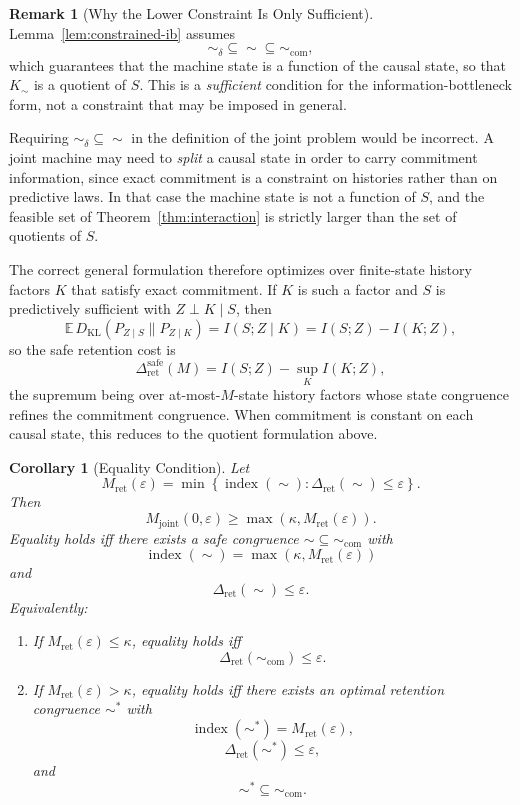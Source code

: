 \documentclass[12pt]{article}
\newtheorem{corollary}[theorem]{Corollary}
\theoremstyle{definition}
\newtheorem{remark}[theorem]{Remark}
\begin{document}
\begin{remark}[Why the Lower Constraint Is Only Sufficient]
\label{rem:no-lower-constraint}
Lemma~\ref{lem:constrained-ib} assumes
\[
\sim_\delta\subseteq\sim\subseteq\sim_{\mathrm{com}},
\]
which guarantees that the machine state is a function of the causal state, so
that $K_\sim$ is a quotient of $S$.  This is a \emph{sufficient} condition for
the information-bottleneck form, not a constraint that may be imposed in
general.

Requiring $\sim_\delta\subseteq\sim$ in the definition of the joint problem
would be incorrect.  A joint machine may need to \emph{split} a causal state
in order to carry commitment information, since exact commitment is a
constraint on histories rather than on predictive laws.  In that case the
machine state is not a function of $S$, and the feasible set of
Theorem~\ref{thm:interaction} is strictly larger than the set of quotients of
$S$.

The correct general formulation therefore optimizes over finite-state history
factors $K$ that satisfy exact commitment.  If $K$ is such a factor and $S$ is
predictively sufficient with $Z\perp K\mid S$, then
\[
\mathbb E\,D_{\mathrm{KL}}(P_{Z\mid S}\|P_{Z\mid K})
=
I(S;Z\mid K)
=
I(S;Z)-I(K;Z),
\]
so the safe retention cost is
\[
\Delta_{\mathrm{ret}}^{\mathrm{safe}}(M)
=
I(S;Z)
-
\sup_{K}
I(K;Z),
\]
the supremum being over at-most-$M$-state history factors whose state
congruence refines the commitment congruence.  When commitment is constant on
each causal state, this reduces to the quotient formulation above.
\end{remark}

\begin{corollary}[Equality Condition]
\label{cor:interaction-equality}
Let
\[
M_{\mathrm{ret}}(\varepsilon)
=
\min
\left\{
\operatorname{index}(\sim):
\Delta_{\mathrm{ret}}(\sim)\le\varepsilon
\right\}.
\]
Then
\[
M_{\mathrm{joint}}(0,\varepsilon)
\ge
\max(\kappa,M_{\mathrm{ret}}(\varepsilon)).
\]
Equality holds iff there exists a safe congruence
$\sim\subseteq\sim_{\mathrm{com}}$ with
\[
\operatorname{index}(\sim)
=
\max(\kappa,M_{\mathrm{ret}}(\varepsilon))
\]
and
\[
\Delta_{\mathrm{ret}}(\sim)\le\varepsilon.
\]
Equivalently:
\begin{enumerate}[label=(\arabic*)]
\item If $M_{\mathrm{ret}}(\varepsilon)\le\kappa$, equality holds iff
\[
\Delta_{\mathrm{ret}}(\sim_{\mathrm{com}})\le\varepsilon.
\]
\item If $M_{\mathrm{ret}}(\varepsilon)>\kappa$, equality holds iff there
exists an optimal retention congruence $\sim^*$ with
\[
\operatorname{index}(\sim^*)=M_{\mathrm{ret}}(\varepsilon),
\]
\[
\Delta_{\mathrm{ret}}(\sim^*)\le\varepsilon,
\]
and
\[
\sim^*\subseteq\sim_{\mathrm{com}}.
\]
\end{enumerate}
\end{corollary}
\end{document}
